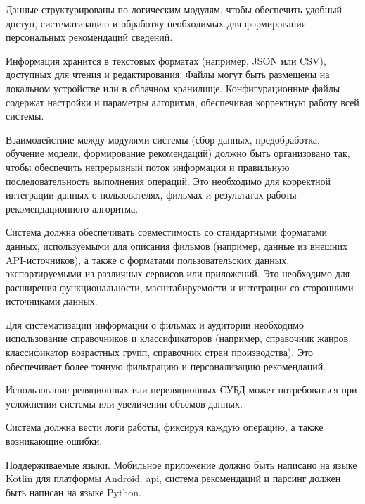 Данные структурированы по логическим модулям, чтобы обеспечить удобный доступ,
систематизацию и обработку необходимых для формирования персональных рекомендаций сведений.


Информация хранится в текстовых форматах (например, JSON или CSV), доступных для чтения и редактирования.
Файлы могут быть размещены на локальном устройстве или в облачном хранилище.
Конфигурационные файлы содержат настройки и параметры алгоритма,
обеспечивая корректную работу всей системы.


Взаимодействие между модулями системы (сбор данных, предобработка, обучение модели, формирование рекомендаций)
должно быть организовано так, чтобы обеспечить непрерывный поток информации и правильную
последовательность выполнения операций. Это необходимо для корректной интеграции данных о пользователях,
фильмах и результатах работы рекомендационного алгоритма.


Система должна обеспечивать совместимость со стандартными форматами данных,
используемыми для описания фильмов (например, данные из внешних API-источников),
а также с форматами пользовательских данных, экспортируемыми из различных
сервисов или приложений. Это необходимо для расширения функциональности,
масштабируемости и интеграции со сторонними источниками данных.


Для систематизации информации о фильмах и аудитории необходимо использование
справочников и классификаторов (например, справочник жанров, классификатор возрастных групп,
справочник стран производства). Это обеспечивает более точную фильтрацию и персонализацию рекомендаций.


Использование реляционных или нереляционных СУБД может потребоваться
при усложнении системы или увеличении объёмов данных.



Система должна вести логи работы, фиксируя каждую операцию, а также возникающие ошибки.


Поддерживаемые языки.
Мобильное приложение должно быть написано на языке Kotlin для платформы Android.
api, система рекомендаций и парсинг должен быть написан на языке Python.

